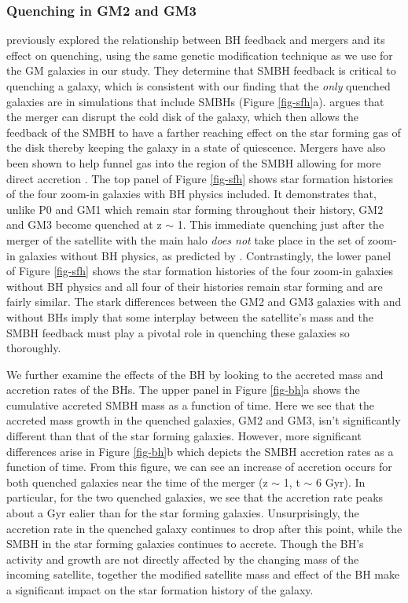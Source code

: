 \documentclass[]{emulateapj}
\begin{document}
\subsubsection{Quenching in GM2 and GM3} \label{subsec-quench}
\cite{Pontzen2017a} previously explored the relationship between BH feedback and mergers and its effect on quenching, using the same genetic modification technique as we use for the GM galaxies in our study. They determine that SMBH feedback is critical to quenching a galaxy, which is consistent with our finding that the \textit{only} quenched galaxies are in simulations that include SMBHs (Figure \ref{fig-sfh}a). \cite{Pontzen2017a} argues that the merger can disrupt the cold disk of the galaxy, which then allows the feedback of the SMBH to have a farther reaching effect on the star forming gas of the disk thereby keeping the galaxy in a state of quiescence. Mergers have also been shown to help funnel gas into the region of the SMBH allowing for more direct accretion \citep{Sanchez2017}. The top panel of Figure \ref{fig-sfh} shows star formation histories of the four zoom-in galaxies with BH physics included. It demonstrates that, unlike P0 and GM1 which remain star forming throughout their history, GM2 and GM3 become quenched at z $\sim$ 1. This immediate quenching just after the merger of the satellite with the main halo \textit{does not} take place in the set of zoom-in galaxies without BH physics, as predicted by \cite{Pontzen2017a}. Contrastingly, the lower panel of Figure \ref{fig-sfh} shows the star formation histories of the four zoom-in galaxies without BH physics and all four of their histories remain star forming and are fairly similar. The stark differences between the GM2 and GM3 galaxies with and without BHs imply that some interplay between the satellite's mass and the SMBH feedback must play a pivotal role in quenching these galaxies so thoroughly. 

We further examine the effects of the BH by looking to the accreted mass and accretion rates of the BHs. The upper panel in Figure \ref{fig-bh}a shows the cumulative accreted SMBH mass as a function of time. Here we see that the accreted mass growth in the quenched galaxies, GM2 and GM3, isn't significantly different than that of the star forming galaxies. However, more significant differences arise in Figure \ref{fig-bh}b which depicts the SMBH accretion rates as a function of time. From this figure, we can see an increase of accretion occurs for both quenched galaxies near the time of the merger (z $\sim$ 1, t $\sim$ 6 Gyr). In particular, for the two quenched galaxies, we see that the accretion rate peaks about a Gyr ealier than for the star forming galaxies. Unsurprisingly, the accretion rate in the quenched galaxy continues to drop after this point, while the SMBH in the star forming galaxies continues to accrete. Though the BH's activity and growth are not directly affected by the changing mass of the incoming satellite, together the modified satellite mass and effect of the BH make a significant impact on the star formation history of the galaxy.  
\end{document}
